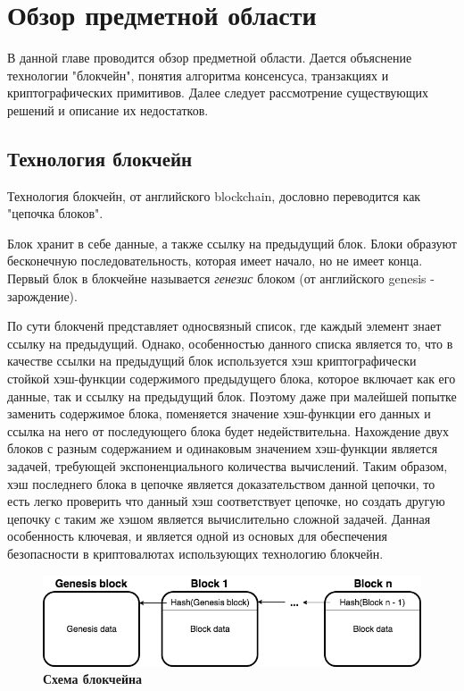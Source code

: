 
\graphicspath{ {images/} }

\startrelatedwork

\chapter{Обзор предметной области}
В данной главе проводится обзор предметной области.
Дается объяснение технологии "блокчейн", понятия алгоритма консенсуса, транзакциях и
криптографических примитивов.
Далее следует рассмотрение существующих решений и описание их недостатков.

\section{Технология блокчейн}

Технология блокчейн, от английского blockchain, дословно переводится  как "цепочка блоков".

Блок хранит в себе данные, а также ссылку на предыдущий блок. 
Блоки образуют бесконечную последовательность, которая имеет начало, но не имеет конца.
Первый блок в блокчейне называется \textit{генезис} блоком (от английского genesis - зарождение).

По сути блокченй представляет односвязный список, где каждый элемент знает ссылку на предыдущий. 
Однако, особенностью данного списка является то,  что в качестве ссылки на предыдущий блок 
используется хэш криптографически стойкой хэш-функции содержимого предыдущего блока, 
которое включает как его данные, так и ссылку на предыдущий блок. 
Поэтому даже при малейшей попытке заменить содержимое блока, 
поменяется значение хэш-функции его данных и ссылка на него от последующего блока будет недействительна.
Нахождение двух блоков с разным содержанием и одинаковым значением хэш-функции является  задачей, требующей экспоненциального количества вычислений. 
Таким образом, хэш последнего блока в цепочке является доказательством данной цепочки, то есть легко проверить что данный хэш соответствует цепочке, но создать другую цепочку с таким же хэшом является вычислительно сложной задачей. Данная особенность ключевая, и  является одной из основых для обеспечения безопасности в криптовалютах использующих технологию блокчейн.

\begin{figure}[h]
\includegraphics[scale=0.6]{Blockchain_Scheme}
\caption{\textbf{Схема блокчейна}}
\label{fig:blockchain}
\end{figure}

